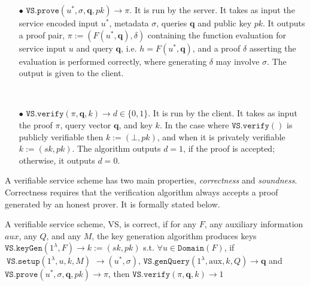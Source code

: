 \begin{definition}[VS Scheme]
\begin{itemize}
\




\item[$\bullet$] $\mathtt{VS.prove}(u^{\scriptscriptstyle *},\sigma, \bm{q}, pk)\rightarrow \pi$. It is run by the server. It  takes as input the service encoded input $u^{\scriptscriptstyle *}$, metadata $\sigma$,   queries $\bm{q}$ and public key $pk$. It outputs a proof pair, $\pi :=(F(u^{\scriptscriptstyle *}, \bm{q}),\delta)$ containing the function evaluation for service input $u$ and query $\bm{q}$, i.e. $h=F(u^{\scriptscriptstyle *},\bm{q})$, and a proof $\delta$ asserting the evaluation is performed correctly, where generating $\delta$ may involve $\sigma$. The output is given to the client. 

\

\item[$\bullet$] $\mathtt{VS.verify}(\pi, \bm{q}, k)\rightarrow d\in\{0,1\}$. It is run by the client. It takes as input the proof $\pi$,   query vector $\bm{q}$, and  key  $k$.   In the case where $\mathtt{VS.verify}()$ is publicly verifiable then $k:=(\bot,pk)$,  and when it is privately verifiable $k:=(sk,pk)$. The algorithm  outputs $d=1$, if the proof is accepted; otherwise, it outputs $d=0$. 



\end{itemize}
\end{definition}


A verifiable service scheme has two main properties, \emph{correctness} and \emph{soundness}. Correctness requires that  the verification algorithm always accepts a proof generated by an honest prover.  It is formally stated below.

\begin{definition}[VS Correctness] A verifiable service scheme, VS, is  correct,  if for any $F$,  any auxiliary information $aux$, any  $Q$, and any $M$, the key generation algorithm produces keys $\mathtt{VS.keyGen}(1^{\lambda},F)\rightarrow k:=(sk,pk)$ s.t. $\forall u \in \mathtt{Domain}(F)$, if $\ \mathtt{VS.setup}(1^{\lambda}, u,k,M)$ $\rightarrow (u^{\scriptscriptstyle *},\sigma)$,  $\mathtt{VS.genQuery}(1^{\lambda}, \text{aux},k,Q)\rightarrow \bm{q}$ and $\mathtt{VS.prove}(u^{\scriptscriptstyle *},\sigma, \bm{q},pk)\rightarrow \pi$, then $\mathtt{VS.verify}(\pi, \bm{q}, k)\rightarrow 1$
\end{definition}

